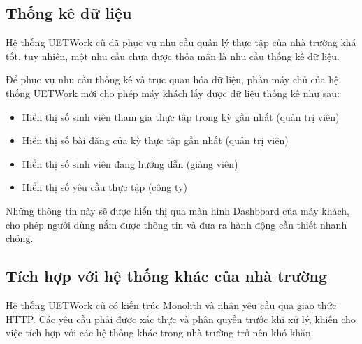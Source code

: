 \documentclass[./../main.tex]{subfiles}
\begin{document}
\hypertarget{thux1ed1ng-kuxea-dux1eef-liux1ec7u}{%
	\subsection{Thống kê dữ
		liệu}\label{thux1ed1ng-kuxea-dux1eef-liux1ec7u}}

Hệ thống UETWork cũ đã phục vụ nhu cầu quản lý thực tập của nhà trường khá tốt, tuy nhiên, một nhu cầu chưa được thỏa mãn là nhu cầu thống kê dữ liệu.


Để phục vụ nhu cầu thống kê và trực quan hóa dữ liệu, phần máy chủ của hệ thống UETWork mới cho phép máy khách lấy được dữ liệu thống kê như sau:

\begin{itemize}
	\item

	      Hiển thị số sinh viên tham gia thực tập trong kỳ gần nhất (quản trị
	      viên)

	\item

	      Hiển thị số bài đăng của kỳ thực tập gần nhất (quản trị viên)

	\item

	      Hiển thị số sinh viên đang hướng dẫn (giảng viên)

	\item

	      Hiển thị số yêu cầu thực tập (công ty)

\end{itemize}

Những thông tin này sẽ được hiển thị qua màn hình Dashboard của máy khách, cho phép người dùng nắm được thông tin và đưa ra hành động cần thiết nhanh chóng.

\subsection{Tích hợp với hệ thống khác của nhà trường}

Hệ thống UETWork cũ có kiến trúc Monolith và nhận yêu cầu qua giao thức HTTP. Các yêu cầu phải được xác thực và phân quyền trước khi xử lý, khiến cho việc tích hợp với các hệ thống khác trong nhà trường trở nên khó khăn.
\end{document}
